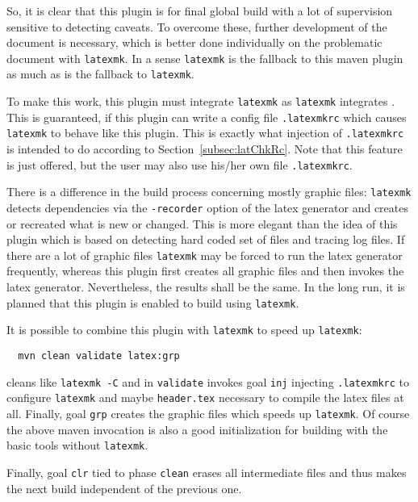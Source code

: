 So, it is clear that this plugin is for final global build with a lot of supervision 
sensitive to detecting caveats. 
To overcome these, further development of the document is necessary, 
which is better done individually on the problematic document with \texttt{latexmk}. 
In a sense \texttt{latexmk} is the fallback to this maven plugin 
as much as \lualatex{} is the fallback to \texttt{latexmk}. 

To make this work, this plugin must integrate \texttt{latexmk} 
as \texttt{latexmk} integrates \lualatex{}. 
This is guaranteed, if this plugin can write a config file \texttt{.latexmkrc} 
which causes \texttt{latexmk} to behave like this plugin. 
This is exactly what injection of \texttt{.latexmkrc} is intended to do 
according to Section~\ref{subsec:latChkRc}. 
Note that this feature is just offered, 
but the user may also use his/her own file \texttt{.latexmkrc}. 

There is a difference in the build process concerning mostly graphic files: 
\texttt{latexmk} detects dependencies via the \texttt{-recorder} option of the latex generator 
and creates or recreated what is new or changed. 
This is more elegant than the idea of this plugin 
which is based on detecting hard coded set of files 
and tracing log files. 
If there are a lot of graphic files 
\texttt{latexmk} may be forced to run the latex generator frequently, 
whereas this plugin first creates all graphic files and then invokes the latex generator. 
Nevertheless, the results shall be the same. 
In the long run, it is planned that this plugin is enabled to build using \texttt{latexmk}. 

It is possible to combine this plugin with \texttt{latexmk} to speed up \texttt{latexmk}: 
%
\begin{Verbatim}
  mvn clean validate latex:grp
\end{Verbatim}
%
cleans like \texttt{latexmk -C} and in \texttt{validate} 
invokes goal \texttt{inj} injecting \texttt{.latexmkrc} to configure \texttt{latexmk} 
and maybe \texttt{header.tex} necessary to compile the latex files at all. 
Finally, goal \texttt{grp} creates the graphic files which speeds up \texttt{latexmk}. 
Of course the above maven invocation is also a good initialization 
for building with the basic tools without \texttt{latexmk}. 

Finally, goal \texttt{clr} tied to phase \texttt{clean} erases all intermediate files 
and thus makes the next build independent of the previous one. 


